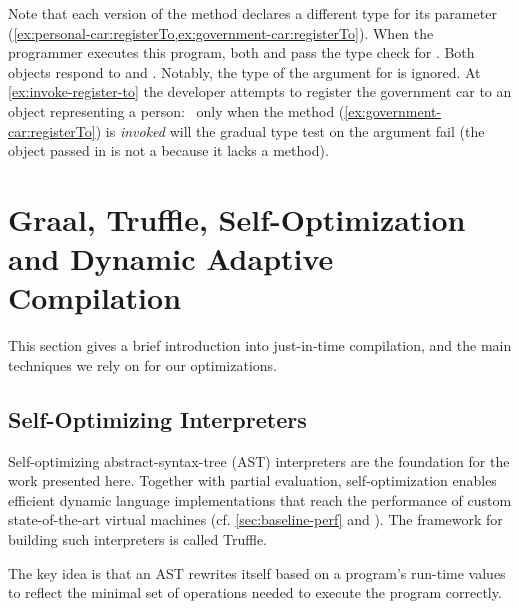 Note that each version of the  method
declares a different type for its parameter
(\cref{ex:personal-car:registerTo,ex:government-car:registerTo}).
%
When the programmer executes this program,
both  and  pass the 
type check for . Both objects respond to
 and . Notably,
the type of the argument for  is ignored.
%
At \cref{ex:invoke-register-to} the developer
attempts to register the government car to an object representing a person:%
~only when the method (\cref{ex:government-car:registerTo}) is \emph{invoked}
will the gradual type test on the argument fail
(the object passed in is not a  because it lacks a
 method).

\section{Graal, Truffle, Self-Optimization and Dynamic Adaptive Compilation}
\label{sec:background-implementation}

This section gives a brief introduction into just-in-time compilation,
and the main techniques we rely on for our optimizations.

\subsection{Self-Optimizing Interpreters}
\label{sec:background-self-opt}

Self-optimizing abstract-syntax-tree (AST) interpreters\citep{Wurthinger:2012:SelfOptAST}
are the foundation for the work presented here.
Together with partial evaluation\citep{Wurthinger:2017:PPE},
self-optimization enables efficient dynamic language implementations
that reach the performance of custom state-of-the-art virtual machines
(cf. \cref{sec:baseline-perf} and \citep{Marr:2015:MTPE}).
The framework for building such interpreters is called Truffle.

The key idea is that an AST rewrites itself based on a program's run-time values
to reflect the minimal set of operations needed to execute the program correctly.

